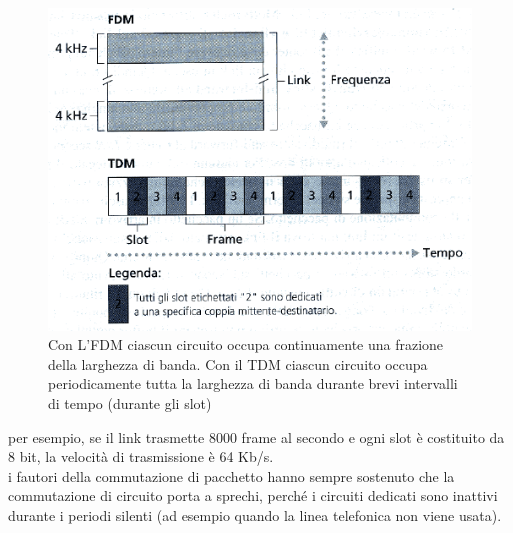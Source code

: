 \documentclass[11pt,a4paper]{article}
\begin{document}
\begin{figure}
	\begin{center}
		\includegraphics[scale=0.7]{img/003.png}
		\caption{Con L'FDM ciascun circuito occupa continuamente una frazione della larghezza di banda. Con il TDM ciascun circuito occupa periodicamente tutta la larghezza di banda durante brevi intervalli di tempo (durante gli slot)}
	\end{center}
\end{figure}

per esempio, se il link trasmette 8000 frame al secondo e ogni slot è costituito da 8 bit, la velocità di trasmissione è 64 Kb/s. \\
i fautori della commutazione di pacchetto hanno sempre sostenuto che la commutazione di circuito porta a sprechi, perché i circuiti dedicati sono inattivi durante i periodi silenti (ad esempio quando la linea telefonica non viene usata).
\end{document}
